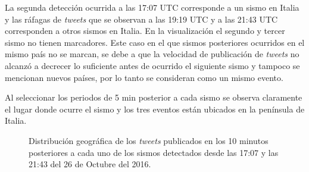 	
	La segunda detección ocurrida a las 17:07 UTC corresponde a un sismo en Italia y las ráfagas de \textit{tweets} que se observan a las 19:19 UTC y a las 21:43 UTC corresponden a otros sismos en Italia. En la visualización el segundo y tercer sismo no tienen marcadores. Este caso en el que sismos posteriores ocurridos en el mismo país no se marcan, se debe a que la velocidad de publicación de \textit{tweets} no alcanzó a decrecer lo suficiente antes de ocurrido el siguiente sismo y tampoco se mencionan nuevos países, por lo tanto se consideran como un mismo evento. 

	
	Al seleccionar los periodos de 5 min posterior a cada sismo se observa claramente el lugar donde ocurre el sismo y los tres eventos están ubicados en la península de Italia.
	
	\begin{figure}[ht]
	\centering
	\hfill
  	\hfill
  	\caption{Distribución geográfica de los \textit{tweets} publicados en los 10 minutos posteriores a cada uno de los sismos detectados desde las 17:07 y las 21:43 del 26 de Octubre del 2016.}
  	\label{fig:sismoitaliamult}
  	\end{figure}
	
